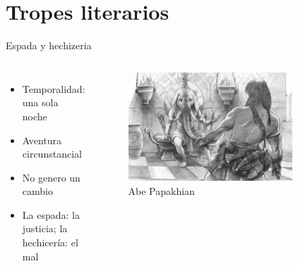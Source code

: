 \section{Tropes literarios}
\begin{frame}{Espada y hechizeria}
\begin{columns}
 \begin{itemize}
    \item Temporalidad: una sola noche
    \item Aventura circunstancial
    \item No genero un cambio
    \item La espada: la justicia; la hechicería: el mal
 \end{itemize}
 \begin{figure}[htb]
    \centering
    \includegraphics[width=0.8\textwidth]{img/tributos/elephant07}
    \caption{Abe Papakhian}
 \end{figure}
 \end{columns}
\end{frame}
\note{

}

